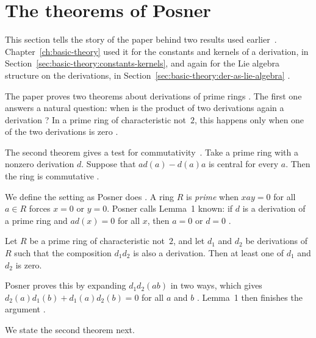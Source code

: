 \section{The theorems of Posner}\label{sec:prime-semiprime:posner}

This section tells the story of the paper behind two results used earlier~\cite{Posner1957}.
Chapter~\ref{ch:basic-theory} used it for the constants and kernels of a
derivation, in Section~\ref{sec:basic-theory:constants-kernels}, and again for
the Lie algebra structure on the derivations, in
Section~\ref{sec:basic-theory:der-as-lie-algebra} \cite{Posner1957}.

The paper proves two theorems about derivations of prime rings
\cite[p.~1093]{Posner1957}. The first one answers a natural question: when is
the product of two derivations again a derivation
\cite[p.~1093]{Posner1957}? In a prime ring of
characteristic not~$2$, this happens only when one of the two derivations is
zero \cite[p.~1093]{Posner1957}.

The second theorem gives a test for commutativity~\cite[p.~1093]{Posner1957}. Take a prime ring with a
nonzero derivation $d$. Suppose that $ad(a)-d(a)a$ is central for every $a$.
Then the ring is commutative \cite[p.~1093]{Posner1957}.

We define the setting as Posner does \cite[p.~1093]{Posner1957}. A ring $R$ is
\emph{prime} when $xay=0$ for all $a\in R$ forces $x=0$ or $y=0$. Posner calls
Lemma~1 known: if $d$ is a derivation of a prime ring and $ad(x)=0$ for all
$x$, then $a=0$ or $d=0$ \cite[Lemma~1, p.~1093]{Posner1957}.

\begin{theorem}\label{thm:prime:posner-one}
Let $R$ be a prime ring of characteristic not~$2$, and let $d_1$ and $d_2$ be
derivations of $R$ such that the composition $d_1d_2$ is also a derivation.
Then at least one of $d_1$ and $d_2$ is zero.
\end{theorem}

Posner proves this by expanding $d_1d_2(ab)$ in two ways, which gives
$d_2(a)d_1(b)+d_1(a)d_2(b)=0$ for all $a$ and $b$ \cite[p.~1094]{Posner1957}.
Lemma~1 then finishes the argument \cite[p.~1094]{Posner1957}.

We state the second theorem next.

